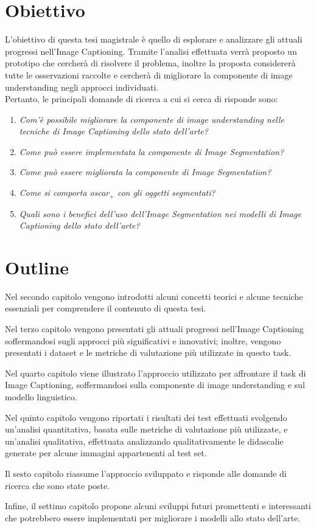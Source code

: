 \section{Obiettivo}\label{obiettivo}
L'obiettivo di questa tesi magistrale è quello di esplorare e analizzare gli attuali progressi nell'Image Captioning. Tramite l'analisi effettuata verrà proposto un prototipo che cercherà di risolvere il problema, inoltre la proposta considererà tutte le osservazioni raccolte e cercherà di migliorare la componente di image understanding negli approcci individuati.\\
Pertanto, le principali domande di ricerca a cui si cerca di risponde sono:
\begin{enumerate}[leftmargin=1.5cm,label=\textit{RQ\arabic*:},ref=\textit{RQ\arabic*}]
    \item\textit{Com'è possibile migliorare la componente di image understanding nelle tecniche di Image Captioning dello stato dell'arte?}
    \item\textit{Come può essere implementata la componente di Image Segmentation?}
    \item\textit{Come può essere migliorata la componente di Image Segmentation?}
    \item\textit{Come si comporta \acrshort{oscar}$_+$ con gli oggetti segmentati?}
    \item \textit{Quali sono i benefici dell'uso dell'Image Segmentation nei modelli di Image Captioning dello stato dell'arte?}
\end{enumerate}

\section{Outline}
Nel secondo capitolo vengono introdotti alcuni concetti teorici e alcune tecniche essenziali per comprendere il contenuto di questa tesi.

Nel terzo capitolo vengono presentati gli attuali progressi nell'Image Captioning soffermandosi sugli approcci più significativi e innovativi; inoltre, vengono presentati i dataset e le metriche di valutazione più utilizzate in questo task.

Nel quarto capitolo viene illustrato l'approccio utilizzato per affrontare il task di Image Captioning, soffermandosi sulla componente di image understanding e sul modello linguistico.

Nel quinto capitolo vengono riportati i risultati dei test effettuati svolgendo un'analisi quantitativa, basata sulle metriche di valutazione più utilizzate, e un'analisi qualitativa, effettuata analizzando qualitativamente le didascalie generate per alcune immagini appartenenti al test set.

Il sesto capitolo riassume l'approccio sviluppato e risponde alle domande di ricerca che sono state poste.

Infine, il settimo capitolo propone alcuni sviluppi futuri promettenti e interessanti che potrebbero essere implementati per migliorare i modelli allo stato dell'arte.